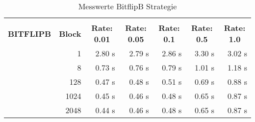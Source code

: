 \begin{table}[!htb]

\begin{tabular}{rrrrrrr}
\hline\\
\multicolumn{0}{c}{\colorbox{myblue}{\textbf{BITFLIPB}}} &  
\multicolumn{0}{c}{\colorbox{myblue}{\textbf{Block}}} &  
\multicolumn{0}{c}{\colorbox{myblue}{\textbf{Rate: 0.01}}} &  
\multicolumn{0}{c}{\colorbox{myblue}{\textbf{Rate: 0.05}}} & 
\multicolumn{0}{c}{\colorbox{myblue}{\textbf{Rate: 0.1}}} &
\multicolumn{0}{c}{\colorbox{myblue}{\textbf{Rate: 0.5}}} & 
\multicolumn{0}{c}{\colorbox{myblue}{\textbf{Rate: 1.0}}}\\
 & 1 & 2.80 s & 2.79 s & 2.86 s & 3.30 s & 3.02 s \\
 & 8 & 0.73 s & 0.76 s & 0.79 s & 1.01 s & 1.18 s \\
 & 128 & 0.47 s & 0.48 s & 0.51 s & 0.69 s & 0.88 s  \\ 
 & 1024 & 0.45 s & 0.46 s & 0.48 s & 0.65 s & 0.87 s \\
 & 2048 & 0.44 s & 0.46 s & 0.48 s & 0.65 s & 0.87 s  \\
\hline
\end{tabular}

\caption{Messwerte BitflipB Strategie}
\label{tblBitflipB}

\end{table}

